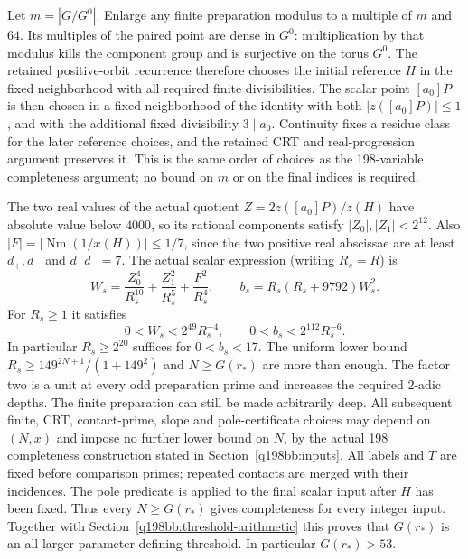 Let $m=|G/G^0|$.  Enlarge any finite preparation modulus to a multiple
of $m$ and $64$.  Its multiples of the paired point are dense in
$G^0$: multiplication by that modulus kills the component group and
is surjective on the torus $G^0$.
The retained positive-orbit recurrence therefore chooses the initial
reference $H$ in the fixed neighborhood with all required finite
divisibilities.  The scalar point $[a_0]P$ is then chosen in a fixed
neighborhood of the identity with both $|z([a_0]P)|\le1$, and with the additional fixed divisibility $3\mid a_0$.
Continuity fixes a residue class for the later reference choices,
and the retained CRT and real-progression argument preserves it.
This is the same order of choices as the 198-variable completeness
argument; no bound on $m$ or on the final indices is required.

The two real values of the actual quotient
$Z=2z([a_0]P)/z(H)$ have absolute value below $4000$,
so its rational components satisfy $|Z_0|,|Z_1|<2^{12}$.
Also $|F|=|\operatorname{Nm}(1/x(H))|\le1/7$, since the two positive
real abscissae are at least $d_+,d_-$ and $d_+d_-=7$.
The actual scalar expression (writing $R_s=R$) is
\[
 W_s=\frac{Z_0^4}{R_s^{10}}+\frac{Z_1^2}{R_s^5}+\frac{F^2}{R_s^4},
 \qquad b_s=R_s(R_s+9792)W_s^2.
\]
For $R_s\ge1$ it satisfies
\[
 0<W_s<2^{49}R_s^{-4},\qquad 0<b_s<2^{112}R_s^{-6}.
\]
In particular $R_s\ge2^{20}$ suffices for $0<b_s<17$.
The uniform lower bound
$R_s\ge149^{2N+1}/(1+149^2)$ and $N\ge G(r_*)$ are more than enough.
The factor two is a unit at every odd preparation prime and increases
the required $2$-adic depths. The finite preparation can still be made
arbitrarily deep. All subsequent finite, CRT, contact-prime, slope and
pole-certificate choices may depend on $(N,x)$ and impose no further
lower bound on $N$, by the actual 198 completeness construction stated
in Section~\ref{q198bb:inputs}. All labels and $T$ are fixed before
comparison primes; repeated contacts are merged with their incidences.
The pole predicate is applied to the final scalar input after $H$ has
been fixed. Thus every $N\ge G(r_*)$ gives completeness for every
integer input. Together with Section~\ref{q198bb:threshold-arithmetic}
this proves that $G(r_*)$ is an all-larger-parameter defining threshold.
In particular $G(r_*)>53$.




